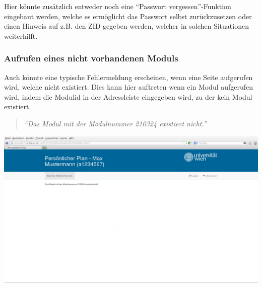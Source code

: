 \documentclass[a4paper,10pt]{scrartcl}
\begin{document}
Hier könnte zusätzlich entweder noch eine ``Passwort vergessen''-Funktion eingebaut werden, welche es ermöglicht das Passwort selbst zurückzusetzen oder einen
Hinweis auf z.B. den ZID gegeben werden, welcher in solchen Situationen weiterhilft.

\subsubsection*{Aufrufen eines nicht vorhandenen Moduls}

Auch könnte eine typische Fehlermeldung erscheinen, wenn eine Seite aufgerufen wird, welche nicht existiert. Dies kann hier auftreten wenn ein Modul aufgerufen wird, indem die Modulid in der Adressleiste
eingegeben wird, zu der kein Modul existiert.

\begin{quote}
 \textit{``Das Modul mit der Modulnummer 210324 existiert nicht.''}
\end{quote} 

\begin{center}
 \includegraphics[scale=0.4]{./fehlermeldung4.png}
\end{center}
\end{document}

